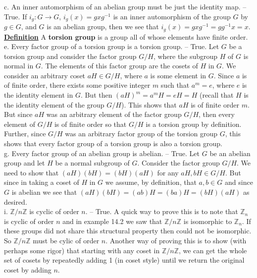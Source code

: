 \documentclass[12pt, letterpaper]{article}
\begin{document}
c. An inner automorphism of an abelian group must be just the identity map. -- True. If $i_g : G \rightarrow G$, $i_g(x) = gxg^{-1}$ is an inner automorphism of the group $G$ by $g \in G$, and $G$ is an abelian group, then we see that $i_g(x) = gxg^{-1} = gg^{-1}x  = x$. \\

\noindent \underline{\bf Definition} A {\bf torsion group} is a group all of whose elements have finite order. \\

e. Every factor group of a torsion group is a torsion group. -- True. Let $G$ be a torsion group and consider the factor group $G / H$, where the subgroup $H$ of $G$ is normal in $G$. The elements of this factor group are the cosets of $H$ in $G$. We consider an arbitrary coset $aH \in G / H$, where $a$ is some element in $G$. Since $a$ is of finite order, there exists some positive integer $m$ such that $a^m = e$, where $e$ is the identity element in $G$. But then $(aH)^m = a^mH = eH = H$ (recall that $H$ is the identity element of the group $G / H$). This shows that $aH$ is of finite order $m$. But since $aH$ was an arbitrary element of the factor group $G / H$, then every element of $G / H$ is of finite order so that $G/H$ is a torsion group by definition. Further, since $G/H$ was an arbitrary factor group of the torsion group $G$, this shows that every factor group of a torsion group is also a torsion group. \\

g. Every factor group of an abelian group is abelian. -- True. Let $G$ be an abelian group and let $H$ be a normal subgroup of $G$. Consider the factor group $G / H$. We need to show that $(aH)(bH) = (bH)(aH)$ for any $aH,bH \in G / H$. But since in taking a coset of $H$ in $G$ we assume, by definition, that $a,b \in G$ and since $G$ is abelian we see that $(aH)(bH) = (ab)H = (ba)H = (bH)(aH)$ as desired. \\

i. $\mathbb{Z} / n\mathbb{Z}$ is cyclic of order $n$. -- True. A quick way to prove this is to note that $\mathbb{Z}_n$ is cyclic of order $n$ and in example 14.2 we saw that $\mathbb{Z} / n\mathbb{Z}$ is isomorphic to $\mathbb{Z}_n$. If these groups did not share this structural property then could not be isomorphic. So $\mathbb{Z} / n\mathbb{Z}$ must be cylic of order $n$. Another way of proving this is to show (with perhaps some rigor) that starting with any coset in $\mathbb{Z} / n\mathbb{Z}$, we can get the whole set of cosets by repeatedly adding 1 (in coset style) until we return the original coset by adding $n$. \\
\end{document}
